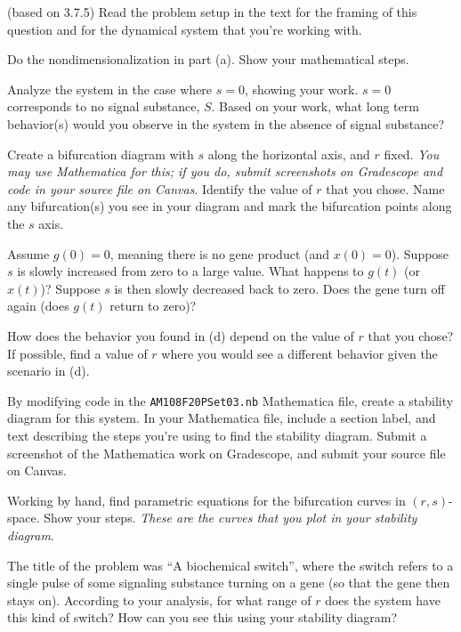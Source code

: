 \documentclass[12pt,letterpaper,noanswers]{exam}
\begin{document}
\begin{questions}
\question (based on 3.7.5)  Read the problem setup in the text for the framing of this question and for the dynamical system that you're working with.

\begin{parts}
\item Do the nondimensionalization in part (a).  Show your mathematical steps.
\item Analyze the system in the case where $s = 0$, showing your work.  $s = 0$ corresponds to no signal substance, $S$.  Based on your work, what long term behavior(s) would you observe in the system in the absence of signal substance?
\item Create a bifurcation diagram with $s$ along the horizontal axis, and $r$ fixed.  \emph{You may use Mathematica for this; if you do, submit screenshots on Gradescope and code in your source file on Canvas}.  Identify the value of $r$ that you chose.  Name any bifurcation(s) you see in your diagram and mark the bifurcation points along the $s$ axis.
\item Assume $g(0) = 0$, meaning there is no gene product (and $x(0) = 0$).  Suppose $s$ is slowly increased from zero to a large value.  What happens to $g(t)$ (or $x(t)$)?  Suppose $s$ is then slowly decreased back to zero.  Does the gene turn off again (does $g(t)$ return to zero)?
\item How does the behavior you found in (d) depend on the value of $r$ that you chose?  If possible, find a value of $r$ where you would see a different behavior given the scenario in (d).
\item By modifying code in the \texttt{AM108F20PSet03.nb} Mathematica file, create a stability diagram for this system.  In your Mathematica file, include a section label, and text describing the steps you're using to find the stability diagram.  Submit a screenshot of the Mathematica work on Gradescope, and submit your source file on Canvas.
\item Working by hand, find parametric equations for the bifurcation curves in $(r,s)$-space.  Show your steps.  \emph{These are the curves that you plot in your stability diagram}.
\item The title of the problem was ``A biochemical switch'', where the switch refers to a single pulse of some signaling substance turning on a gene (so that the gene then stays on).  According to your analysis, for what range of $r$ does the system have this kind of switch?  How can you see this using your stability diagram?
\end{parts}


\end{questions}
\end{document}

